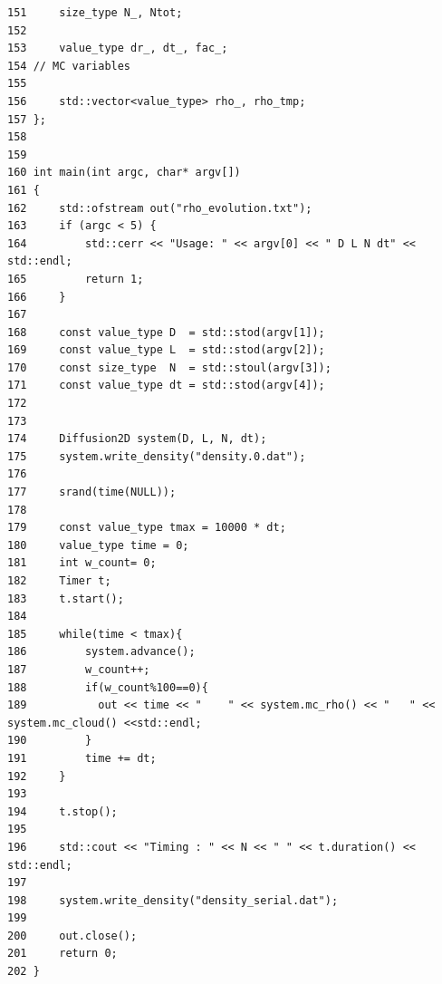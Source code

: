 \documentclass[12pt]{scrbook}
\begin{document}
\begin{lstlisting}[language=CodeBlocks]
151     size_type N_, Ntot;
152 
153     value_type dr_, dt_, fac_;
154 // MC variables
155 
156     std::vector<value_type> rho_, rho_tmp;
157 };
158 
159 
160 int main(int argc, char* argv[])
161 {
162     std::ofstream out("rho_evolution.txt");
163     if (argc < 5) {
164         std::cerr << "Usage: " << argv[0] << " D L N dt" << std::endl;
165         return 1;
166     }
167 
168     const value_type D  = std::stod(argv[1]);
169     const value_type L  = std::stod(argv[2]);
170     const size_type  N  = std::stoul(argv[3]);
171     const value_type dt = std::stod(argv[4]);
172 
173 
174     Diffusion2D system(D, L, N, dt);
175     system.write_density("density.0.dat");
176 
177     srand(time(NULL));
178 
179     const value_type tmax = 10000 * dt;
180     value_type time = 0;
181     int w_count= 0;
182     Timer t;
183     t.start();
184 
185     while(time < tmax){
186         system.advance();
187         w_count++;
188         if(w_count%100==0){
189           out << time << "    " << system.mc_rho() << "   " << system.mc_cloud() <<std::endl;
190         }
191         time += dt;
192     }
193 
194     t.stop();
195 
196     std::cout << "Timing : " << N << " " << t.duration() << std::endl;
197 
198     system.write_density("density_serial.dat");
199 
200     out.close();
201     return 0;
202 }
\end{lstlisting}
\end{document}
